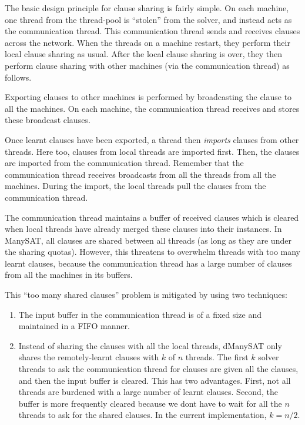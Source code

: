 \documentclass{article}
\begin{document}
The basic design principle for clause sharing is fairly simple. On
each machine, one thread from the thread-pool is ``stolen'' from the
solver, and instead acts as the communication thread. This
communication thread sends and receives clauses across the
network. When the threads on a machine restart, they perform their
local clause sharing as usual. After the local clause sharing is over,
they then perform clause sharing with other machines (via the
communication thread) as follows.


Exporting clauses to other machines is performed by broadcasting the
clause to all the machines. On each machine, the communication thread
receives and stores these broadcast clauses. 

Once learnt clauses have been exported, a thread then \emph{imports}
clauses from other threads. Here too, clauses from local threads are
imported first. Then, the clauses are imported from the communication
thread. Remember that the communication thread receives broadcasts
from all the threads from all the machines. During the import, the
local threads pull the clauses from the communication thread. 


The communication thread maintains a buffer of received clauses which
is cleared when local threads have already merged these clauses into
their instances. In ManySAT, all clauses are shared between all
threads (as long as they are under the sharing quotas). However, this
threatens to overwhelm threads with too many learnt clauses, because
the communication thread has a large number of clauses from all the
machines in its buffers. 

This ``too many shared clauses'' problem is mitigated by using two techniques:

\begin{enumerate}
\item The input buffer in the communication thread is of a fixed size and maintained in a FIFO manner.
\item Instead of sharing the clauses with all the local threads,
  dManySAT only shares the remotely-learnt clauses with $k$ of $n$
  threads. The first $k$ solver threads to ask the communication
  thread for clauses are given all the clauses, and then the input
  buffer is cleared. This has two advantages. First, not all threads
  are burdened with a large number of learnt clauses. Second, the
  buffer is more frequently cleared because we dont have to wait for
  all the $n$ threads to ask for the shared clauses. In the current
  implementation, $k=n/2$. 
\end{enumerate}
\end{document}
